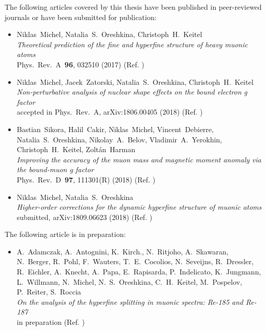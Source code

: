 \ifthispageodd{}{\cleardoublepage}


\noindent \normalfont
The following articles covered by this thesis have been published in peer-reviewed \\journals or have been submitted for publication:

\begin{itemize}
\item Niklas~Michel, Natalia~S.~Oreshkina, Christoph~H.~Keitel \\ 
\textit{Theoretical prediction of the fine and hyperfine structure of heavy muonic atoms} \\ 
Phys.~Rev.~A~\textbf{96}, 032510 (2017) (Ref. \cite{michel2017})\vspace*{1pt}
\item Niklas~Michel, Jacek~Zatorski, Natalia~S.~Oreshkina, Christoph~H.~Keitel \\ 
\textit{Non-perturbative analysis of nuclear shape effects on the bound electron g factor}\\
accepted in Phys.~Rev.~A, arXiv:1806.00405 (2018) (Ref. \cite{michel_nuclDef}) \vspace*{1pt}
\item Bastian~Sikora, Halil~Cakir, Niklas~Michel, Vincent~Debierre, Natalia~S.~Oreshkina, Nikolay~A.~Belov, Vladimir~A.~Yerokhin, Christoph~H.~Keitel, Zoltán~Harman \\ 
\textit{Improving the accuracy of the muon mass and magnetic moment anomaly via the bound-muon g factor} \\ 
Phys.~Rev.~D~\textbf{97}, 111301(R) (2018) (Ref. \cite{sikora2018}) \vspace*{1pt}
\item Niklas~Michel, Natalia~S.~Oreshkina \\ 
\textit{Higher-order corrections for the dynamic hyperfine structure of muonic atoms}\\
submitted, arXiv:1809.06623 (2018) (Ref. \cite{michel_muonHO}) \vspace*{1pt}
\end{itemize} 

\noindent
The following article is in preparation:

\begin{itemize}
\item A.~Adamczak, A.~Antognini, K.~Kirch., N.~Ritjoho, A.~Skawaran, N.~Berger, R.~Pohl, F.~Wauters, T.~E.~Cocolios, N.~Seveijns, R.~Dressler, R.~Eichler, A.~Knecht, A.~Papa, E.~Rapisarda, P.~Indelicato, K.~Jungmann, L.~Willmann, N.~Michel, N.~S.~Oreshkina, C.~H.~Keitel, M.~Pospelov, P.~Reiter, S.~Roccia\\ 
\textit{On the analysis of the hyperfine splitting in muonic spectra:
Re-185 and Re-187} \\ 
in preparation (Ref. \cite{psiReDraft}) \vspace*{1pt} \\
\end{itemize} 

